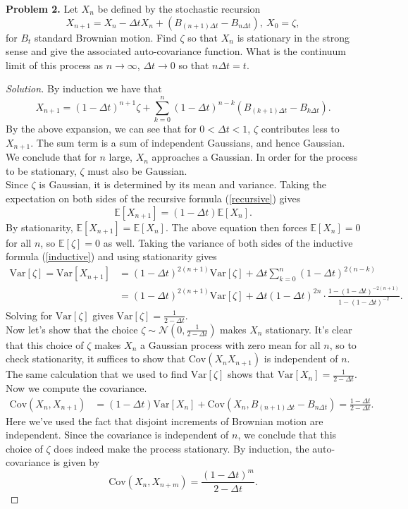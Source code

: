 \documentclass[11pt,letterpaper]{report}
\newcommand{\mcal}[1]{\mathcal{#1}}
\newcommand{\E}{\mathbb{E}}
\newcommand{\Var}{\text{Var}}
\newcommand{\Cov}{\text{Cov}}
\newenvironment{solution}
{\begin{proof}[Solution]}
{\end{proof}}
\begin{document}
\noindent\textbf{Problem 2. }Let $X_n$ be defined by the stochastic recursion
\begin{equation}\label{recursive}
X_{n+1} = X_n - \Delta tX_n + (B_{(n+1)\Delta t} - B_{n\Delta t}),\ X_0 = \zeta,
\end{equation}
for $B_t$ standard Brownian motion. Find $\zeta$ so that $X_n$ is stationary in the strong sense and give the associated auto-covariance function. What is the continuum limit of this process as $n\to \infty$, $\Delta t\to 0$ so that $n\Delta t = t$.
\begin{solution}
	By induction we have that
	\begin{equation}\label{inductive}
	X_{n+1} = (1-\Delta t)^{n+1}\zeta + \sum_{k=0}^n(1-\Delta t)^{n-k}(B_{(k+1)\Delta t} - B_{k\Delta t}).
	\end{equation}
	By the above expansion, we can see that for $0<\Delta t< 1$, $\zeta$ contributes less to $X_{n+1}$. The sum term is a sum of independent Gaussians, and hence Gaussian. We conclude that for $n$ large, $X_n$ approaches a Gaussian. In order for the process to be stationary, $\zeta$ must also be Gaussian.\\

	\noindent Since $\zeta$ is Gaussian, it is determined by its mean and variance. Taking the expectation on both sides of the recursive formula (\ref{recursive}) gives
	\[
	\E[X_{n+1}] = (1-\Delta t)\E[X_n].
	\]
	By stationarity, $\E[X_{n+1}] = \E[X_n]$. The above equation then forces $\E[X_n] = 0$ for all $n$, so $\E[\zeta] = 0$ as well. Taking the variance of both sides of the inductive formula (\ref{inductive}) and using stationarity gives
	\begin{align*}
	\Var[\zeta] = \Var[X_{n+1}] &= (1-\Delta t)^{2(n+1)}\Var[\zeta] + \Delta t\sum_{k=0}^n(1-\Delta t)^{2(n-k)}\\
	&= (1-\Delta t)^{2(n+1)}\Var[\zeta] + \Delta t (1-\Delta t)^{2n}\cdot \frac{1-(1-\Delta t)^{-2(n+1)}}{1-(1-\Delta t)^{-2}}.
	\end{align*}
	Solving for $\Var[\zeta]$ gives $\Var[\zeta] = \frac{1}{2-\Delta t}$.\\

	\noindent Now let's show that the choice $\zeta \sim \mcal{N}(0, \frac{1}{2-\Delta t})$ makes $X_n$ stationary. It's clear that this choice of $\zeta$ makes $X_n$ a Gaussian process with zero mean for all $n$, so to check stationarity, it suffices to show that $\Cov(X_nX_{n+1})$ is independent of $n$. The same calculation that we used to find $\Var[\zeta]$ shows that $\Var[X_n] = \frac{1}{2-\Delta t}$. Now we compute the covariance.
	\begin{align*}
	\Cov(X_n, X_{n+1}) &= (1-\Delta t)\Var[X_n] + \Cov(X_n, B_{(n+1)\Delta t} - B_{n\Delta t}) = \frac{1-\Delta t}{2-\Delta t}.
	\end{align*}
	Here we've used the fact that disjoint increments of Brownian motion are independent. Since the covariance is independent of $n$, we conclude that this choice of $\zeta$ does indeed make the process stationary. By induction, the auto-covariance is given by
	\[
	\Cov(X_n, X_{n+m}) = \frac{(1-\Delta t)^m}{2-\Delta t}.
	\]
\end{solution}
\end{document}
